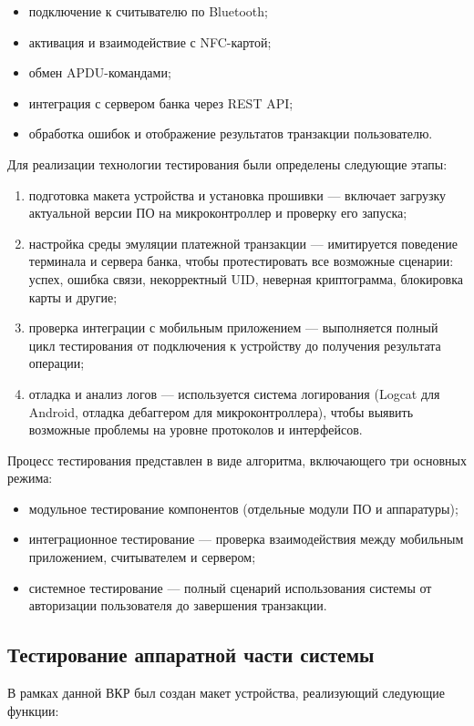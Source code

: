 \begin{itemize}
	\item подключение к считывателю по Bluetooth;
	\item активация и взаимодействие с NFC-картой;
	\item обмен APDU-командами;
	\item интеграция с сервером банка через REST API;
	\item обработка ошибок и отображение результатов транзакции пользователю.
\end{itemize}

Для реализации технологии тестирования были определены следующие этапы:

\begin{enumerate}
	\item подготовка макета устройства и установка прошивки — включает загрузку актуальной версии ПО на микроконтроллер и проверку его запуска;
	\item настройка среды эмуляции платежной транзакции — имитируется поведение терминала и сервера банка, чтобы протестировать все возможные сценарии: успех, ошибка связи, некорректный UID, неверная криптограмма, блокировка карты и другие;
	\item проверка интеграции с мобильным приложением — выполняется полный цикл тестирования от подключения к устройству до получения результата операции;
	\item отладка и анализ логов — используется система логирования (Logcat для Android, отладка дебаггером для микроконтроллера), чтобы выявить возможные проблемы на уровне протоколов и интерфейсов.
\end{enumerate}

Процесс тестирования представлен в виде алгоритма, включающего три основных режима:

\begin{itemize}
	\item модульное тестирование компонентов (отдельные модули ПО и аппаратуры);
	\item интеграционное тестирование — проверка взаимодействия между мобильным приложением, считывателем и сервером;
	\item системное тестирование — полный сценарий использования системы от авторизации пользователя до завершения транзакции.
\end{itemize}

\subsection{Тестирование аппаратной части системы}
В рамках данной ВКР был создан макет устройства, реализующий следующие функции:

